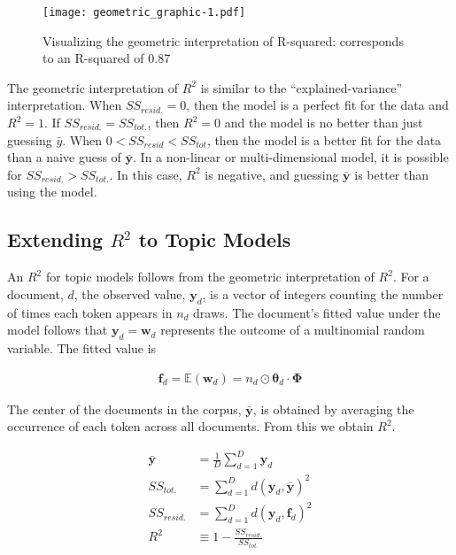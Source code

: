 \documentclass[conference,final,]{IEEEtran}
\makeatletter
\def\maxwidth{\ifdim\Gin@nat@width>\linewidth\linewidth
\else\Gin@nat@width\fi}
\let\Oldincludegraphics\includegraphics
\renewcommand{\includegraphics}[1]{\Oldincludegraphics[width=\maxwidth]{#1}}
\makeatother
\begin{document}
\begin{figure}
\centering
\texttt{[image: geometric\_graphic-1.pdf]}
\caption{Visualizing the geometric interpretation of R-squared:
corresponds to an R-squared of 0.87}
\end{figure}

The geometric interpretation of \(R^2\) is similar to the
``explained-variance'' interpretation. When \(SS_{resid.} = 0\), then
the model is a perfect fit for the data and \(R^2 = 1\). If
\(SS_{resid.} = SS_{tot.}\), then \(R^2 = 0\) and the model is no better
than just guessing \(\bar{y}\). When \(0 < SS_{resid} < SS_{tot}\), then
the model is a better fit for the data than a naive guess of
\(\bar{\mathbf{y}}\). In a non-linear or multi-dimensional model, it is
possible for \(SS_{resid.} > SS_{tot.}\). In this case, \(R^2\) is
negative, and guessing \(\bar{\mathbf{y}}\) is better than using the
model.

\hypertarget{extending-r2-to-topic-models}{%
\subsection{\texorpdfstring{Extending \(R^2\) to Topic
Models}{Extending R\^{}2 to Topic Models}}\label{extending-r2-to-topic-models}}

An \(R^2\) for topic models follows from the geometric interpretation of
\(R^2\). For a document, \(d\), the observed value, \(\mathbf{y}_d\), is
a vector of integers counting the number of times each token appears in
\(n_d\) draws. The document's fitted value under the model follows that
\(\mathbf{y}_d = \mathbf{w}_d\) represents the outcome of a multinomial
random variable. The fitted value is

\begin{align}
  \mathbf{f}_d = 
    \mathbb{E}(\mathbf{w}_d) = 
    n_d \odot \boldsymbol\theta_d \cdot \boldsymbol\Phi 
\end{align}

The center of the documents in the corpus, \(\bar{\mathbf{y}}\), is
obtained by averaging the occurrence of each token across all documents.
From this we obtain \(R^2\).

\begin{align}
    \bar{\mathbf{y}} &= \frac{1}{D}\sum_{d=1}^{D}\mathbf{y}_d\\
    SS_{tot.} &= \sum_{d=1}^D{d(\mathbf{y}_d, \bar{\mathbf{y}})^2}\\
    SS_{resid.} &= \sum_{d=1}^D{d(\mathbf{y}_d, \mathbf{f}_d)^2}\\
    R^2 &\equiv 1 - \frac{SS_{resid.}}{SS_{tot.} }
\end{align}
\end{document}
